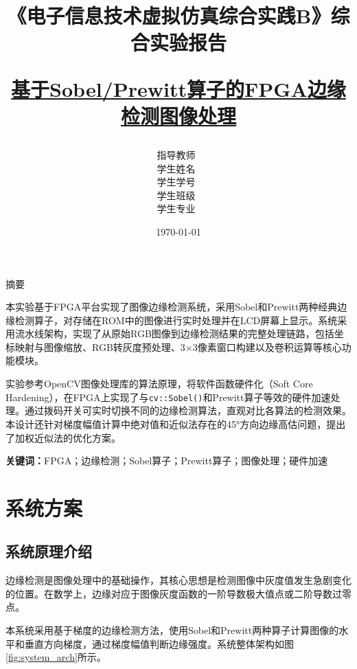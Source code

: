 \documentclass[12pt,hyperref,a4paper,UTF8]{ctexart}
\title{ 
        \vspace{1cm}
        \heiti \Huge \textbf{《电子信息技术虚拟仿真综合实践B》综合实验报告} \par
        \vspace{1cm} 
        \heiti \Large {\underline{基于Sobel/Prewitt算子的FPGA边缘检测图像处理}   }     
    }
\author{
        \kaishu\Large 指导教师\ \dlmu[9cm]{高宇}  \\
        \kaishu\Large 学生姓名\ \dlmu[9cm]{陈文轩} \\
        \kaishu\Large 学生学号\ \dlmu[9cm]{23040447} \\
        \kaishu\Large 学生班级\ \dlmu[9cm]{23186011} \\
        \kaishu\Large 学生专业\ \dlmu[9cm]{智能硬件与系统(电子信息工程)} \qquad  \\
    }
\date{\today}
\begin{document}
\cover
\thispagestyle{empty}

\newpage
\setcounter{page}{1}

\begin{center}
\heiti\Large 摘\quad 要
\end{center}

本实验基于FPGA平台实现了图像边缘检测系统，采用Sobel和Prewitt两种经典边缘检测算子，对存储在ROM中的图像进行实时处理并在LCD屏幕上显示。系统采用流水线架构，实现了从原始RGB图像到边缘检测结果的完整处理链路，包括坐标映射与图像缩放、RGB转灰度预处理、3×3像素窗口构建以及卷积运算等核心功能模块。

实验参考OpenCV图像处理库的算法原理，将软件函数硬件化（Soft Core Hardening），在FPGA上实现了与\texttt{cv::Sobel()}和Prewitt算子等效的硬件加速处理。通过拨码开关可实时切换不同的边缘检测算法，直观对比各算法的检测效果。本设计还针对梯度幅值计算中绝对值和近似法存在的45°方向边缘高估问题，提出了加权近似法的优化方案。

\vspace{0.5cm}
\noindent\textbf{关键词：}FPGA；边缘检测；Sobel算子；Prewitt算子；图像处理；硬件加速

\newpage

\section{系统方案}

\subsection{系统原理介绍}

边缘检测是图像处理中的基础操作，其核心思想是检测图像中灰度值发生急剧变化的位置。在数学上，边缘对应于图像灰度函数的一阶导数极大值点或二阶导数过零点。

本系统采用基于梯度的边缘检测方法，使用Sobel和Prewitt两种算子计算图像的水平和垂直方向梯度，通过梯度幅值判断边缘强度。系统整体架构如图\ref{fig:system_arch}所示。
\end{document}
